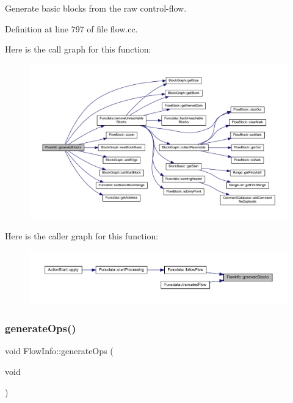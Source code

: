 Generate basic blocks from the raw control-\/flow. 



Definition at line 797 of file flow.\+cc.

Here is the call graph for this function\+:
\nopagebreak
\begin{figure}[H]
\begin{center}
\leavevmode
\includegraphics[width=350pt]{class_flow_info_a5c8f51cb6c88719657801a2f26e87fae_cgraph}
\end{center}
\end{figure}
Here is the caller graph for this function\+:
\nopagebreak
\begin{figure}[H]
\begin{center}
\leavevmode
\includegraphics[width=350pt]{class_flow_info_a5c8f51cb6c88719657801a2f26e87fae_icgraph}
\end{center}
\end{figure}
\mbox{\label{class_flow_info_afe680152d016a3ec80e155f3ea85f26c}} 
\subsubsection{\texorpdfstring{generateOps()}{generateOps()}}
{\footnotesize\ttfamily void Flow\+Info\+::generate\+Ops (\begin{DoxyParamCaption}\item[{void}]{ }\end{DoxyParamCaption})}




